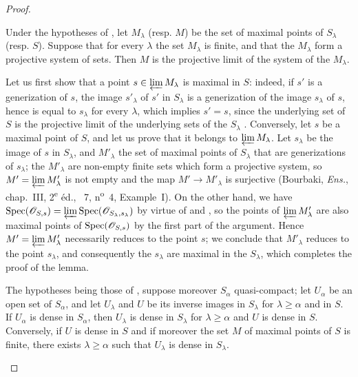 \begin{proof}
\begin{lemma}[20.3.8.3]
\label{IV.20.3.8.3}
Under the hypotheses of , let $M_\lambda$ \textup{(resp. $M$)} be the set of maximal points of $S_\lambda$ \textup{(resp. $S$)}.
Suppose that for every $\lambda$ the set $M_\lambda$ is finite, and that the $M_\lambda$ form a projective system of sets.
Then $M$ is the projective limit of the system of the $M_\lambda$.
\end{lemma}

Let us first show that a point $s\in\varprojlim M_\lambda$ is maximal in $S$: indeed, if $s'$ is a generization of $s$, the image $s'_\lambda$ of $s'$ in $S_\lambda$ is a generization of the image $s_\lambda$ of $s$, hence is equal to $s_\lambda$ for every $\lambda$, which implies $s'=s$, since the underlying set of $S$ is the projective limit of the underlying sets of the $S_\lambda$ .
Conversely, let $s$ be a maximal point of $S$, and let us prove that it belongs to $\varprojlim M_\lambda$.
Let $s_\lambda$ be the image of $s$ in $S_\lambda$, and $M'_\lambda$ the set of maximal points of $S_\lambda$ that are generizations of $s_\lambda$; the $M'_\lambda$ are non-empty finite sets which form a projective system, so $M'=\varprojlim M'_\lambda$ is not empty and the map $M'\to M'_\lambda$ is surjective (Bourbaki, \emph{Ens.}, chap.~III, 2\textsuperscript{e} éd., \textsection~7, n\textsuperscript{o}~4, Example~I).
On the other hand, we have $\operatorname{Spec}(\mathscr{O}_{S,s})=\varprojlim\operatorname{Spec}(\mathscr{O}_{S_\lambda,s_\lambda})$ by virtue of  and , so the points of $\varprojlim M'_\lambda$ are also maximal points of $\operatorname{Spec}(\mathscr{O}_{S,s})$ by the first part of the argument.
Hence $M'=\varprojlim M'_\lambda$ necessarily reduces to the point $s$; we conclude that $M'_\lambda$ reduces to the point $s_\lambda$, and consequently the $s_\lambda$ are maximal in the $S_\lambda$, which completes the proof of the lemma.

\begin{lemma}[20.3.8.4]
\label{IV.20.3.8.4}
The hypotheses being those of , suppose moreover $S_\alpha$ quasi-compact; let $U_\alpha$ be an open set of $S_\alpha$, and let $U_\lambda$ and $U$ be its inverse images in $S_\lambda$ for $\lambda\geq\alpha$ and in $S$.
If $U_\alpha$ is dense in $S_\alpha$, then $U_\lambda$ is dense in $S_\lambda$ for $\lambda\geq\alpha$ and $U$ is dense in $S$.
Conversely, if $U$ is dense in $S$ and if moreover the set $M$ of maximal points of $S$ is finite, there exists $\lambda\geq\alpha$ such that $U_\lambda$ is dense in $S_\lambda$.
\end{lemma}


\end{proof}
